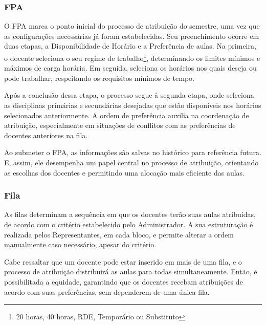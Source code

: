 \documentclass[12pt]{article}
\begin{document}
\subsubsection{FPA}
\par O FPA marca o ponto inicial do processo de atribuição do semestre, uma vez que as configurações necessárias já foram estabelecidas. Seu preenchimento ocorre em duas etapas, a Disponibilidade de Horário e a Preferência de aulas. Na primeira, o docente seleciona o seu regime de trabalho\footnote{20 horas, 40 horas, RDE, Temporário ou Substituto}, determinando os limites mínimos e máximos de carga horária. Em seguida, seleciona os horários nos quais deseja ou pode trabalhar, respeitando os requisitos mínimos de tempo.
\par Após a conclusão dessa etapa, o processo segue à segunda etapa, onde seleciona as disciplinas primárias e secundárias desejadas que estão disponíveis nos horários selecionados anteriormente. A ordem de preferência auxilia na coordenação de atribuição, especialmente em situações de conflitos com as preferências de docentes anteriores na fila.
\par Ao submeter o FPA, as informações são salvas no histórico para referência futura. E, assim, ele desempenha um papel central no processo de atribuição, orientando as escolhas dos docentes e permitindo uma alocação mais eficiente das aulas.
\subsubsection{Fila}
\par As filas determinam a sequência em que os docentes terão suas aulas atribuídas, de acordo com o critério estabelecido pelo Administrador. A sua estruturação é realizada pelos Representantes, em cada bloco, e permite alterar a ordem manualmente caso necessário, apesar do critério. 
\par Cabe ressaltar que um docente pode estar inserido em mais de uma fila, e o processo de atribuição distribuirá as aulas para todas simultaneamente. Então, é possibilitada a equidade, garantindo que os docentes recebam atribuições de acordo com suas preferências, sem dependerem de uma única fila.
\end{document}
